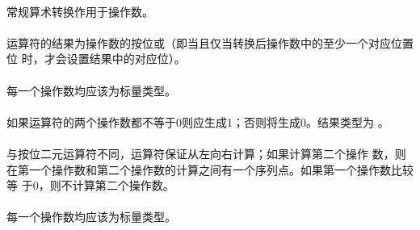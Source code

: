 {\semantic
\paragraph{}
常规算术转换作用于操作数。

\paragraph{}
运算符\tm{|}的结果为操作数的按位或（即当且仅当转换后操作数中的至少一个对应位置位
时，才会设置结果中的对应位）。

\syntax
\paragraph{}

\constraint
\paragraph{}
每一个操作数均应该为标量类型。

\semantic
\paragraph{}
如果\tm{\&\&}运算符的两个操作数都不等于0则应生成1；否则将生成0。结果类型为
。

\paragraph{}
与按位二元\tm{\&}运算符不同，\tm{\&\&}运算符保证从左向右计算；如果计算第二个操作
数，则在第一个操作数和第二个操作数的计算之间有一个序列点。如果第一个操作数比较等
于0，则不计算第二个操作数。

\syntax
\paragraph{}

\constraint
\paragraph{}
每一个操作数均应该为标量类型。

}
